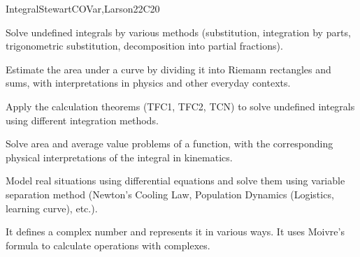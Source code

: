 \begin{syllabus}
\begin{unit}{Integral}{}{StewartCOVar,Larson}{22}{C20}
   \begin{learningoutcomes}
      \item Solve undefined integrals by various methods (substitution, integration by parts, trigonometric substitution, decomposition into partial fractions).
      \item Estimate the area under a curve by dividing it into Riemann rectangles and sums, with interpretations in physics and other everyday contexts.  
      \item Apply the calculation theorems (TFC1, TFC2, TCN) to solve undefined integrals using different integration methods.
      \item Solve area and average value problems of a function, with the corresponding physical interpretations of the integral in kinematics.
      \item Model real situations using differential equations and solve them using variable separation method (Newton's Cooling Law, Population Dynamics (Logistics, learning curve), etc.).
      \item It defines a complex number and represents it in various ways. It uses Moivre's formula to calculate operations with complexes.
   \end{learningoutcomes}
\end{unit}

\begin{coursebibliography}
\end{coursebibliography}


\end{syllabus}

%
